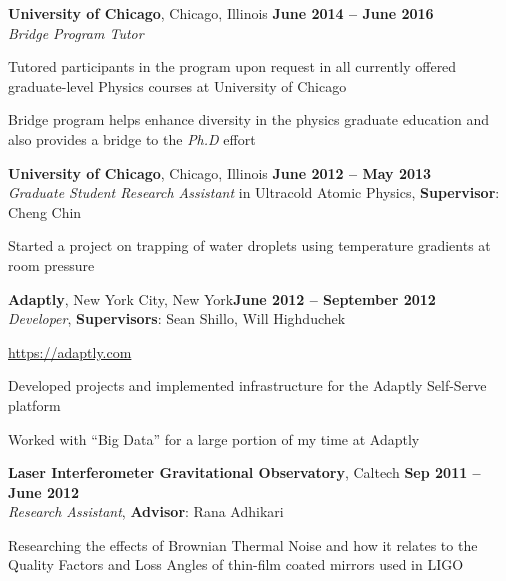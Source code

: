 \documentclass[margin,line]{resume}
\begin{document}
\begin{resume}
\textbf{University of Chicago}, Chicago, Illinois \hfill \textbf{June 2014 -- June 2016}\\
\textsl{Bridge Program Tutor}
\begin{list2}
  \item Tutored participants in the program upon request in all currently offered graduate-level Physics courses at University of Chicago
  \item Bridge program helps enhance diversity in the physics graduate education and also provides a bridge to the \textsl{Ph.D} effort
\end{list2}

\textbf{University of Chicago}, Chicago, Illinois  \hfill \textbf{June 2012 -- May 2013}\\
\textsl{Graduate Student Research Assistant} in Ultracold Atomic Physics, \textbf{Supervisor}: Cheng Chin
\begin{list2}
  \item Started a project on trapping of water droplets using temperature gradients at room pressure
\end{list2}

\textbf{Adaptly}, New York City, New York\hfill \textbf{June 2012 -- September 2012}\\
\textsl{Developer}, \textbf{Supervisors}: Sean Shillo, Will Highduchek
\begin{list2}
  \item \url{https://adaptly.com}
  \item Developed projects and implemented infrastructure for the Adaptly Self-Serve platform
  \item Worked with ``Big Data'' for a large portion of my time at Adaptly
\end{list2}


\textbf{Laser Interferometer Gravitational Observatory}, Caltech \hfill \textbf{Sep 2011 -- June 2012}\\
\textsl{Research Assistant}, \textbf{Advisor}: Rana Adhikari
\begin{list2}
  \item Researching the effects of Brownian Thermal Noise and how it relates to the Quality Factors and Loss Angles of thin-film coated mirrors used in LIGO
\end{list2}


\end{resume}
\end{document}
